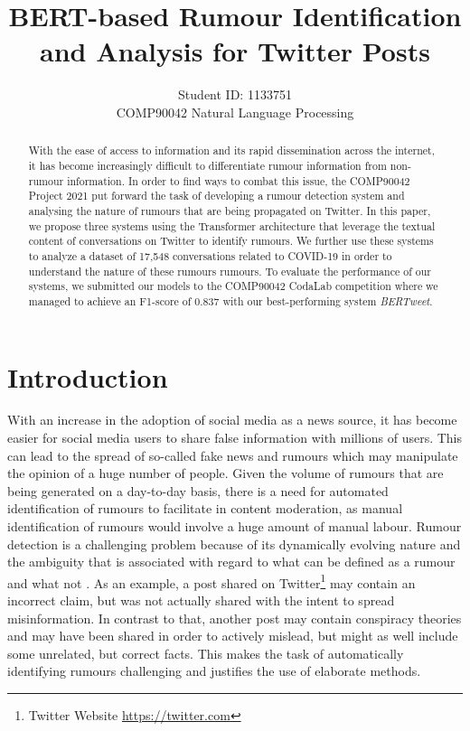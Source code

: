 \documentclass[11pt,a4paper]{article}
\title{BERT-based Rumour Identification and Analysis for Twitter Posts}
\author{ Student ID: 1133751 \\
 COMP90042 Natural Language Processing \\
}
\date{}
\begin{document}
\maketitle
\begin{abstract}
With the ease of access to information and its rapid dissemination across the internet, it has become increasingly difficult to differentiate rumour information from non-rumour information. In order to find ways to combat this issue, the COMP90042 Project 2021 put forward the task of developing a rumour detection system and analysing the nature of rumours that are being propagated on Twitter.
\newline
In this paper, we propose three systems using the Transformer architecture that leverage the textual content of conversations on Twitter to identify rumours. We further use these systems to analyze a dataset of 17,548 conversations related to COVID-19 in order to understand the nature of these rumours rumours. To evaluate the performance of our systems, we submitted our models to the COMP90042 CodaLab competition where we managed to achieve an F1-score of 0.837 with our best-performing system \textit{BERTweet}.
\end{abstract}

\section{Introduction}
With an increase in the adoption of social media as a news source, it has become easier for social media users to share false information with millions of users. This can lead to the spread of so-called fake news and rumours which may manipulate the opinion of a huge number of people.
Given the volume of rumours that are being generated on a day-to-day basis, there is a need for automated identification of rumours to facilitate in content moderation, as manual identification of rumours would involve a huge amount of manual labour.
\newline
Rumour detection is a challenging problem because of its dynamically evolving nature and the ambiguity that is associated with regard to what can be defined as a rumour and what not \citep{RN675}. As an example, a post shared on Twitter\footnote{Twitter Website \url{https://twitter.com}} may contain an incorrect claim, but was not actually shared with the intent to spread misinformation.
In contrast to that, another post may contain conspiracy theories and may have been shared in order to actively mislead, but might as well include some unrelated, but correct facts. This makes the task of automatically identifying  rumours challenging and justifies the use of elaborate methods. 
\end{document}
